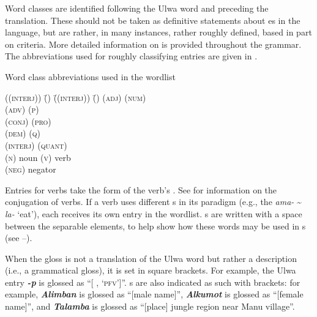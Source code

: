   Word classes are identified following the Ulwa word and preceding the \mbox{} translation. These should not be taken as definitive statements about es in the language, but are rather, in many instances, rather roughly defined, based in part on  criteria. More detailed information on  is provided throughout the grammar. The abbreviations used for roughly classifying  entries are given in .

\ea%
    \label{ex:lexicon:1}
            Word class abbreviations used in the wordlist\\

  \begin{tabbing}
{((\textsc{interj}))} \= {()} \= {((\textsc{interj}))} \= {()}\kill
{(\textsc{adj})} \> {} \> {(\textsc{num})} \> {}\\
{(\textsc{adv})} \> {} \> {(\textsc{p})} \> {}\\
{(\textsc{conj})} \> {} \> {(\textsc{pro})} \> {}\\
{(\textsc{dem})} \> {} \> {(\textsc{q})} \> {}\\
{(\textsc{interj})} \> {} \> {(\textsc{quant})} \> {}\\
{(\textsc{n})} \> {noun} \> {(\textsc{v})} \> {verb}\\
{(\textsc{neg})} \> {negator} \> {} \> {}
\end{tabbing}
\z

  Entries for verbs take the form of the verb’s . See  for information on the conjugation of verbs. If a verb uses different s in its paradigm (e.g., the  \textit{ama-} {\textasciitilde} \textit{la-} ‘eat’), each  receives its own entry in the wordlist. s are written with a space between the separable elements, to help show how these words may be used in s (see --).

  When the  gloss is not a translation of the Ulwa word but rather a description (i.e., a grammatical gloss), it is set in square brackets. For example, the Ulwa entry \textbf{\textit{-p}} is glossed as “[ , ‘\textsc{pfv}’]”. s are also indicated as such with brackets: for example, \textbf{\textit{Alimban}} is glossed as “[male name]”, \textbf{\textit{Alkumot}} is glossed as “[female name]”, and \textbf{\textit{Talamba}} is glossed as “[place] jungle region near Manu village”.


